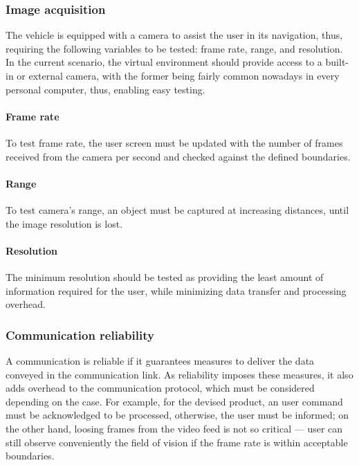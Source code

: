 \subsubsection{Image acquisition}%
\label{sec:orgb1f5c2a}
The vehicle is equipped with a camera to assist the user in its navigation,
thus, requiring the following variables to be tested: frame rate, range, and
resolution. In the current scenario, the virtual environment should provide
access to a built-in or external camera, with the former being fairly common
nowadays in every personal computer, thus, enabling easy testing.

\paragraph{Frame rate}%
\label{sec:frame-rate-test}
To test frame rate, the user screen must be updated with the number of frames
received from the camera per second and checked against the defined boundaries.

\paragraph{Range}%
\label{sec:range-test}
To test camera's range, an object must be captured at increasing distances, until the image resolution is lost.

\paragraph{Resolution}%
\label{sec:resolution-test}
The minimum resolution should be tested as providing the least amount of
information required for the user, while minimizing data transfer and processing overhead.

\subsubsection{Communication reliability}%
\label{sec:comm-reli}
A communication is reliable if it guarantees measures to deliver the data
conveyed in the communication link. As reliability imposes these measures, it
also adds overhead to the communication protocol, which must be considered
depending on the case. For example, for the devised product, an user command
must be acknowledged to be processed, otherwise, the user must be informed; on
the other hand, loosing frames from the video feed is not so critical --- user
can still observe conveniently the field of vision if the frame rate is within
acceptable boundaries. 

